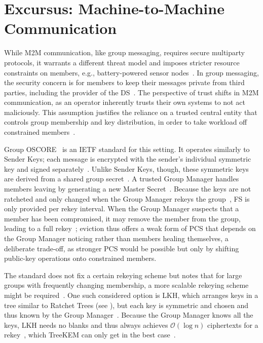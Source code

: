 \documentclass[conference]{IEEEtran}
\begin{document}
\section{Excursus: Machine-to-Machine Communication}
While \ac{M2M} communication, like group messaging, requires secure multiparty protocols, it warrants a different threat model and imposes stricter resource constraints on members, e.g., battery-powered sensor nodes~\cite{prantlSurveySecureGroup2022}.
In group messaging, the security concern is for members to keep their messages private from third parties, including the provider of the \ac{DS}~\cite{beurdoucheMessagingLayerSecurity2025}.
The perspective of trust shifts in \ac{M2M} communication, as an operator inherently trusts their own systems to not act maliciously.
This assumption justifies the reliance on a trusted central entity that controls group membership and key distribution, in order to take workload off constrained members~\cite{tilocaGroupObjectSecurity2026,prantlSurveySecureGroup2022}.

Group OSCORE~\cite{tilocaGroupObjectSecurity2026} is an \ac{IETF} standard for this setting.
It operates similarly to Sender Keys; each message is encrypted with the sender's individual symmetric key and signed separately~\cite{tilocaGroupObjectSecurity2026}.
Unlike Sender Keys, though, these symmetric keys are derived from a shared group secret~\cite{tilocaGroupObjectSecurity2026}.
A trusted Group Manager handles members leaving by generating a new Master Secret~\cite{tilocaGroupObjectSecurity2026}.
Because the keys are not ratcheted and only changed when the Group Manager rekeys the group~\cite{tilocaGroupObjectSecurity2026}, \ac{FS} is only provided per rekey interval.
When the Group Manager suspects that a member has been compromised, it may remove the member from the group, leading to a full rekey~\cite{tilocaGroupObjectSecurity2026};
eviction thus offers a weak form of \ac{PCS} that depends on the Group Manager noticing rather than members healing themselves, a deliberate trade-off, as stronger \ac{PCS} would be possible but only by shifting public-key operations onto constrained members.

The standard does not fix a certain rekeying scheme but notes that for large groups with frequently changing membership, a more scalable rekeying scheme might be required~\cite{tilocaGroupObjectSecurity2026}.
One such considered option is \ac{LKH}, which arranges keys in a tree similar to Ratchet Trees (see ), but each key is symmetric and chosen and thus known by the Group Manager~\cite{chungkeiwongSecureGroupCommunications2000,prantlSurveySecureGroup2022}.
Because the Group Manager knows all the keys, \ac{LKH} needs no blanks and thus always achieves $\mathcal{O}(\log n)$ ciphertexts for a rekey~\cite{chungkeiwongSecureGroupCommunications2000,prantlSurveySecureGroup2022}, which TreeKEM can only get in the best case~\cite{barnesMessagingLayerSecurity2023,solerAnalysisEfficiencyMessaging2025}.
\end{document}
